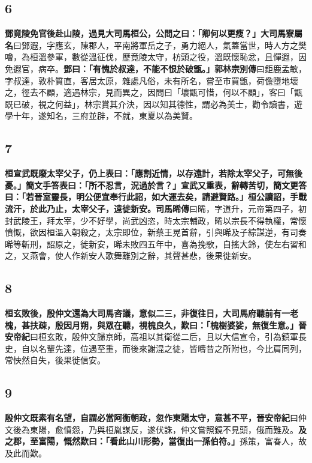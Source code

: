 \subsection*{6}

\textbf{鄧竟陵免官後赴山陵，過見大司馬桓公，公問之曰：「卿何以更瘦？」}{\footnotesize \textbf{大司馬寮屬名}曰鄧遐，字應玄，陳郡人，平南將軍岳之子，勇力絕人，氣蓋當世，時人方之樊噲，為桓溫參軍，數從溫征伐，歷竟陵太守，枋頭之役，溫既懷恥忿，且憚遐，因免遐官，病卒。}\textbf{鄧曰：「有愧於叔達，不能不恨於破甑。」}{\footnotesize \textbf{郭林宗別傳}曰鉅鹿孟敏，字叔達，敦朴質直，客居太原，雜處凡俗，未有所名，嘗至市買甑，荷儋墮地壞之，徑去不顧，適遇林宗，見而異之，因問曰「壞甑可惜，何以不顧」，客曰「甑既已破，視之何益」，林宗賞其介決，因以知其德性，謂必為美士，勸令讀書，遊學十年，遂知名，三府並辟，不就，東夏以為美賢。}

\subsection*{7}

\textbf{桓宣武既廢太宰父子，仍上表曰：「應割近情，以存遠計，若除太宰父子，可無後憂。」簡文手答表曰：「所不忍言，況過於言？」宣武又重表，辭轉苦切，簡文更答曰：「若晉室靈長，明公便宜奉行此詔，如大運去矣，請避賢路。」桓公讀詔，手戰流汗，於此乃止，太宰父子，遠徙新安。}{\footnotesize \textbf{司馬晞傳}曰晞，字道升，元帝第四子，初封武陵王，拜太宰，少不好學，尚武凶恣，時太宗輔政，晞以宗長不得執權，常懷憤慨，欲因桓溫入朝殺之，太宗即位，新蔡王晃首辭，引與晞及子綜謀逆，有司奏晞等斬刑，詔原之，徙新安，晞未敗四五年中，喜為挽歌，自搖大鈴，使左右習和之，又燕會，使人作新安人歌舞離別之辭，其聲甚悲，後果徙新安。}

\subsection*{8}

\textbf{桓玄敗後，殷仲文還為大司馬咨議，意似二三，非復往日，大司馬府聽前有一老槐，甚扶疎，殷因月朔，與眾在聽，視槐良久，歎曰：「槐樹婆娑，無復生意。」}{\footnotesize \textbf{晉安帝紀}曰桓玄敗，殷仲文歸京師，高祖以其衛從二后，且以大信宣令，引為鎮軍長史，自以名輩先達，位遇至重，而後來謝混之徒，皆疇昔之所附也，今比肩同列，常怏然自失，後果徙信安。}

\subsection*{9}

\textbf{殷仲文既素有名望，自謂必當阿衡朝政，忽作東陽太守，意甚不平，}{\footnotesize \textbf{晉安帝紀}曰仲文後為東陽，愈憤怨，乃與桓胤謀反，遂伏誅，仲文嘗照鏡不見頭，俄而難及。}\textbf{及之郡，至富陽，慨然歎曰：「看此山川形勢，當復出一孫伯符。」}{\footnotesize 孫策，富春人，故及此而歎。}